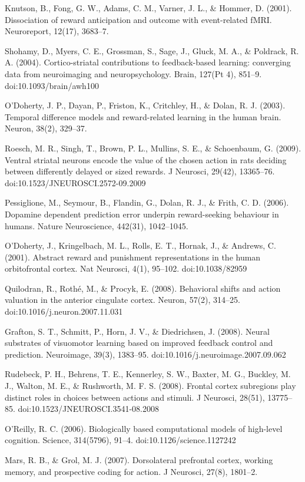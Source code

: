 Knutson, B., Fong, G. W., Adams, C. M., Varner, J. L., & Hommer, D. (2001). Dissociation of reward anticipation and outcome with event-related fMRI. Neuroreport, 12(17), 3683–7.

Shohamy, D., Myers, C. E., Grossman, S., Sage, J., Gluck, M. A., & Poldrack, R. A. (2004). Cortico-striatal contributions to feedback-based learning: converging data from neuroimaging and neuropsychology. Brain, 127(Pt 4), 851–9. doi:10.1093/brain/awh100

O'Doherty, J. P., Dayan, P., Friston, K., Critchley, H., & Dolan, R. J. (2003). Temporal difference models and reward-related learning in the human brain. Neuron, 38(2), 329–37.

Roesch, M. R., Singh, T., Brown, P. L., Mullins, S. E., & Schoenbaum, G. (2009). Ventral striatal neurons encode the value of the chosen action in rats deciding between differently delayed or sized rewards. J Neurosci, 29(42), 13365–76. doi:10.1523/JNEUROSCI.2572-09.2009

Pessiglione, M., Seymour, B., Flandin, G., Dolan, R. J., & Frith, C. D. (2006). Dopamine dependent prediction error underpin reward-seeking behaviour in humans. Nature Neuroscience, 442(31), 1042–1045.

O'Doherty, J., Kringelbach, M. L., Rolls, E. T., Hornak, J., & Andrews, C. (2001). Abstract reward and punishment representations in the human orbitofrontal cortex. Nat Neurosci, 4(1), 95–102. doi:10.1038/82959

Quilodran, R., Rothé, M., & Procyk, E. (2008). Behavioral shifts and action valuation in the anterior cingulate cortex. Neuron, 57(2), 314–25. doi:10.1016/j.neuron.2007.11.031

Grafton, S. T., Schmitt, P., Horn, J. V., & Diedrichsen, J. (2008). Neural substrates of visuomotor learning based on improved feedback control and prediction. Neuroimage, 39(3), 1383–95. doi:10.1016/j.neuroimage.2007.09.062

Rudebeck, P. H., Behrens, T. E., Kennerley, S. W., Baxter, M. G., Buckley, M. J., Walton, M. E., & Rushworth, M. F. S. (2008). Frontal cortex subregions play distinct roles in choices between actions and stimuli. J Neurosci, 28(51), 13775–85. doi:10.1523/JNEUROSCI.3541-08.2008

O'Reilly, R. C. (2006). Biologically based computational models of high-level cognition. Science, 314(5796), 91–4. doi:10.1126/science.1127242

Mars, R. B., & Grol, M. J. (2007). Dorsolateral prefrontal cortex, working memory, and prospective coding for action. J Neurosci, 27(8), 1801–2.

